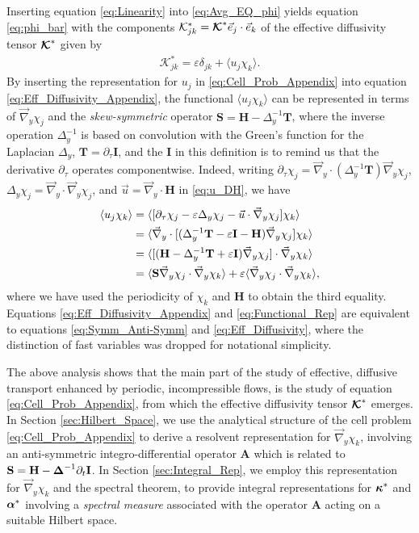 \documentclass[11pt]{amsart}
\newcommand{\Tb}{\mathbf{T}}
\newcommand{\Hb}{\mathbf{H}}
\newcommand{\Ib}{\mathbf{I}}
\newcommand{\Sb}{\mathbf{S}}
\newcommand{\Ab}{\mathbf{A}}
\newcommand{\Kc}{\mathcal{K}}
\newcommand\Kbc{\mbox{\boldmath${\mathcal{K}}$}}
\newcommand\balpha{\mbox{\boldmath${\alpha}$}}
\newcommand\bDelta{\mbox{\boldmath${\Delta}$}}
\newcommand\bkappa{\mbox{\boldmath${\kappa}$}}
\begin{document}
Inserting equation \eqref{eq:Linearity} into \eqref{eq:Avg_EQ_phi}
yields equation \eqref{eq:phi_bar} with the components
$\Kc^*_{jk}=\Kbc^*\vec{e}_j\cdot\vec{e}_k$ of the effective diffusivity
tensor $\Kbc^*$ given by 
%
\begin{align}\label{eq:Eff_Diffusivity_Appendix}
  \Kc^*_{jk}=\varepsilon\delta_{jk}+\langle u_j\chi_k\rangle.
\end{align}
%
By inserting the representation for $u_j$ in
\eqref{eq:Cell_Prob_Appendix} into equation
\eqref{eq:Eff_Diffusivity_Appendix}, the functional $\langle u_j\chi_k\rangle$ can be
represented in terms of $\vec{\nabla}_y\chi_j$ and the \emph{skew-symmetric}
operator $\Sb=\Hb-\Delta_y^{-1}\Tb$, where the inverse operation $\Delta_y^{-1}$
is based on convolution with the Green's function for the Laplacian
$\Delta_y$, $\Tb=\partial_\tau\Ib$, and the $\Ib$ in this definition is to remind us
that the derivative $\partial_\tau$ operates componentwise. Indeed, writing  
$\partial_\tau\chi_j
=\vec{\nabla}_y\cdot(\Delta_y^{-1}\Tb)\vec{\nabla}_y\chi_j$,
$\Delta_y\chi_j=\vec{\nabla}_y\cdot\vec{\nabla}_y\chi_j$, and $\vec{u}=\vec{\nabla}_y\cdot\Hb$ in
\eqref{eq:u_DH}, we have    
%
\begin{align}\label{eq:Functional_Rep}
  \langle u_j\chi_k\rangle&=\langle[\partial_\tau\chi_j-\varepsilon\Delta_y\chi_j-\vec{u}\cdot\vec{\nabla}_y\chi_j]\chi_k\rangle
       \\
       &=\langle\vec{\nabla}_y\cdot[(\Delta_y^{-1}\Tb-\varepsilon\Ib-\Hb)\vec{\nabla}_y\chi_j]\chi_k\rangle
       \notag\\
       &=\langle[(\Hb-\Delta_y^{-1}\Tb+\varepsilon\Ib)\vec{\nabla}_y\chi_j]\cdot\vec{\nabla}_y\chi_k\rangle
       \notag\\
       &=\langle\Sb\vec{\nabla}_y\chi_j\cdot\vec{\nabla}_y\chi_k\rangle+\varepsilon\langle\vec{\nabla}_y\chi_j\cdot\vec{\nabla}_y\chi_k\rangle,
       \notag
\end{align}
%
where we have used the periodicity of $\chi_k$ and $\Hb$ to obtain the
third equality. Equations \eqref{eq:Eff_Diffusivity_Appendix} and
\eqref{eq:Functional_Rep} are equivalent to equations
\eqref{eq:Symm_Anti-Symm} and \eqref{eq:Eff_Diffusivity}, where the
distinction of fast variables was dropped for notational simplicity. 





The above analysis shows that the main part of the study of effective, 
diffusive transport enhanced by periodic, incompressible flows, is the
study of equation \eqref{eq:Cell_Prob_Appendix}, from which the
effective diffusivity tensor $\Kbc^*$ emerges. In Section
\ref{sec:Hilbert_Space}, we use the analytical structure of the cell
problem \eqref{eq:Cell_Prob_Appendix} to derive a resolvent
representation for $\vec{\nabla}_y\chi_k$, involving an anti-symmetric
integro-differential operator $\Ab$ which is related to 
$\Sb=\Hb-\bDelta^{-1}\partial_t\Ib$. In Section \ref{sec:Integral_Rep}, 
we employ this representation for $\vec{\nabla}_y\chi_k$ and the spectral
theorem, to provide integral representations for $\bkappa^*$ and
$\balpha^*$ involving a \emph{spectral measure} associated with the
operator $\Ab$ acting on a suitable Hilbert space.     
   
\end{document}
